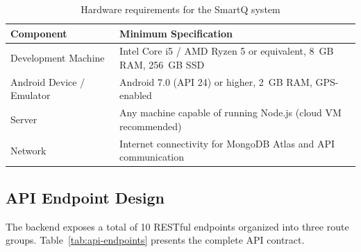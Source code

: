 \documentclass[12pt,a4paper]{article}
\begin{document}
\begin{table}[H]
\centering
\caption{Hardware requirements for the SmartQ system}
\label{tab:hw-req}
\small
\begin{tabularx}{\textwidth}{l X}
\toprule
\textbf{Component} & \textbf{Minimum Specification} \\
\midrule
Development Machine & Intel Core i5 / AMD Ryzen 5 or equivalent, 8~GB RAM, 256~GB SSD \\
Android Device / Emulator & Android 7.0 (API 24) or higher, 2~GB RAM, GPS-enabled \\
Server & Any machine capable of running Node.js (cloud VM recommended) \\
Network & Internet connectivity for MongoDB Atlas and API communication \\
\bottomrule
\end{tabularx}
\end{table}

\subsection{API Endpoint Design}

The backend exposes a total of 10 RESTful endpoints organized into three route groups. Table~\ref{tab:api-endpoints} presents the complete API contract.
\end{document}
